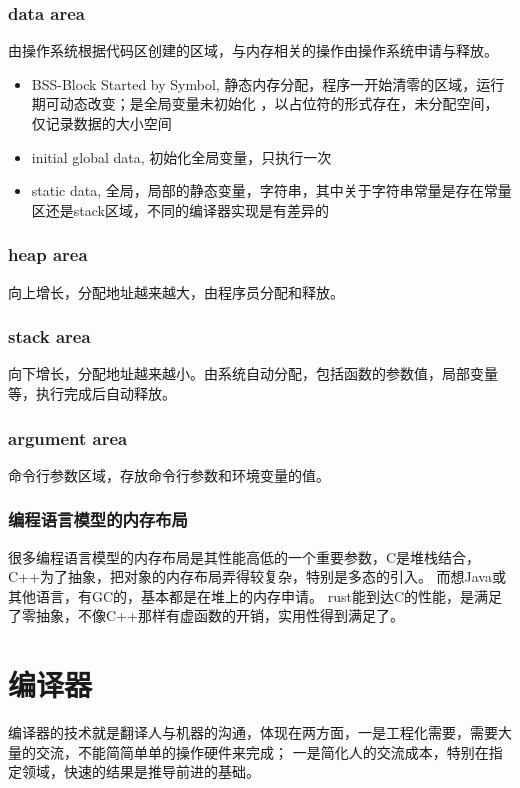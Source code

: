 \subsubsection{data area}
由操作系统根据代码区创建的区域，与内存相关的操作由操作系统申请与释放。
\begin{itemize}
    \item {BSS-Block Started by Symbol, 静态内存分配，程序一开始清零的区域，运行期可动态改变；是全局变量未初始化
    ，以占位符的形式存在，未分配空间，仅记录数据的大小空间
    }
    \item {initial global data, 初始化全局变量，只执行一次}
    \item {static data, 全局，局部的静态变量，字符串，其中关于字符串常量是存在常量区还是stack区域，不同的编译器实现是有差异的}
\end{itemize}

\subsubsection{heap area}
向上增长，分配地址越来越大，由程序员分配和释放。

\subsubsection{stack area}
向下增长，分配地址越来越小。由系统自动分配，包括函数的参数值，局部变量等，执行完成后自动释放。

\subsubsection{argument area}
命令行参数区域，存放命令行参数和环境变量的值。

\subsubsection{编程语言模型的内存布局}
很多编程语言模型的内存布局是其性能高低的一个重要参数，C是堆栈结合，C++为了抽象，把对象的内存布局弄得较复杂，特别是多态的引入。
而想Java或其他语言，有GC的，基本都是在堆上的内存申请。
rust能到达C的性能，是满足了零抽象，不像C++那样有虚函数的开销，实用性得到满足了。

\section{编译器}
编译器的技术就是翻译人与机器的沟通，体现在两方面，一是工程化需要，需要大量的交流，不能简简单单的操作硬件来完成；
一是简化人的交流成本，特别在指定领域，快速的结果是推导前进的基础。

